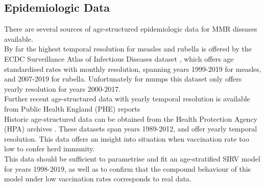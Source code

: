 \documentclass{article}
\theoremstyle{definition}
\begin{document}
\subsection{Epidemiologic Data}
There are several sources of age-structured epidemiologic data for MMR diseases available.\\ By far the highest temporal resolution for measles and rubella is offered by the ECDC Surveillance Atlas of Infectious Diseases dataset \cite{noauthor_surveillance_nodate}, which offers age standardised rates with monthly resolution, spanning years 1999-2019 for measles, and 2007-2019 for rubella. Unfortunately for mumps this dataset only offers yearly resolution for years 2000-2017.\\
Further recent age-structured data with yearly temporal resolution is available from Public Health England (PHE) reports \cite{noauthor_confirmed_nodate,noauthor_mumps_nodate,noauthor_rubella_nodate}\\
Historic age-structured data can be obtained from the Health Protection Agency (HPA) archives \cite{noauthor_archived_nodate,noauthor_archived_nodate-1,noauthor_archived_nodate-2}. These datasets span years 1989-2012, and offer yearly temporal resolution. This data offers an insight into situation when vaccination rate too low to confer herd immunity.\\
This data should be sufficient to parametrise and fit an age-stratified SIRV model for years 1998-2019, as well as to confirm that the compound behaviour of this model under low vaccination rates corresponds to real data.
\end{document}
